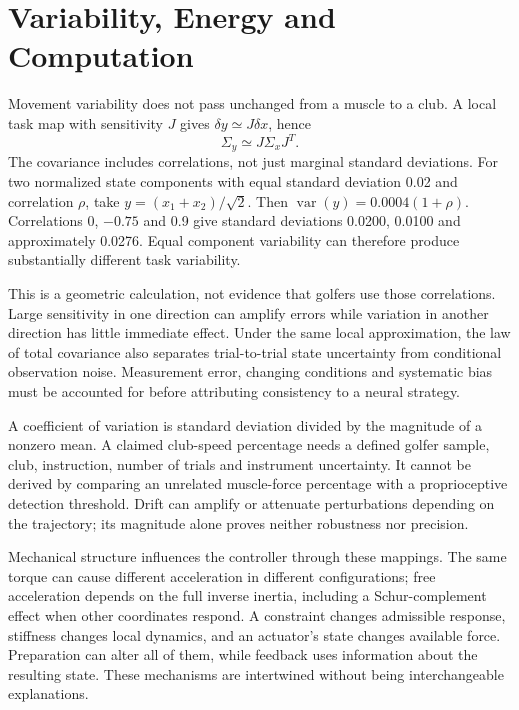 \section{Variability, Energy and Computation}
\label{sec:ch24_power}
Movement variability does not pass unchanged from a muscle to a club. A local task map with sensitivity $J$ gives $\delta y\simeq J\delta x$, hence
\[
\Sigma_y\simeq J\Sigma_xJ^T.
\]
The covariance includes correlations, not just marginal standard deviations. For two normalized state components with equal standard deviation 0.02 and correlation $\rho$, take $y=(x_1+x_2)/\sqrt2$. Then $\operatorname{var}(y)=0.0004(1+\rho)$. Correlations 0, $-0.75$ and 0.9 give standard deviations 0.0200, 0.0100 and approximately 0.0276. Equal component variability can therefore produce substantially different task variability.

This is a geometric calculation, not evidence that golfers use those correlations. Large sensitivity in one direction can amplify errors while variation in another direction has little immediate effect. Under the same local approximation, the law of total covariance also separates trial-to-trial state uncertainty from conditional observation noise. Measurement error, changing conditions and systematic bias must be accounted for before attributing consistency to a neural strategy.

A coefficient of variation is standard deviation divided by the magnitude of a nonzero mean. A claimed club-speed percentage needs a defined golfer sample, club, instruction, number of trials and instrument uncertainty. It cannot be derived by comparing an unrelated muscle-force percentage with a proprioceptive detection threshold. Drift can amplify or attenuate perturbations depending on the trajectory; its magnitude alone proves neither robustness nor precision.

Mechanical structure influences the controller through these mappings. The same torque can cause different acceleration in different configurations; free acceleration depends on the full inverse inertia, including a Schur-complement effect when other coordinates respond. A constraint changes admissible response, stiffness changes local dynamics, and an actuator's state changes available force. Preparation can alter all of them, while feedback uses information about the resulting state. These mechanisms are intertwined without being interchangeable explanations.

